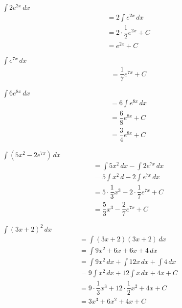 \documentclass[12pt]{article}
\newenvironment{problem}[2][]{
    \begin{trivlist}
        \item[
            {\bfseries #1}
            {\bfseries #2.}
        ]
}{\end{trivlist}}
\begin{document}
\begin{problem}{25}
$\displaystyle\int 2e^{2x} \, dx$
\begin{align}
&= 2 \int e^{2x} \, dx \\
&= 2 \cdot \dfrac{1}{2} e^{2x} + C \\
&= e^{2x} + C
\end{align}
\end{problem}

\begin{problem}{29}
$\displaystyle\int e^{7x} \, dx$
\begin{align}
&= \dfrac{1}{7} e^{7x} + C
\end{align}
\end{problem}

\begin{problem}{33}
$\displaystyle\int 6e^{8x} \, dx$
\begin{align}
&= 6 \int e^{8x} \, dx \\
&= \dfrac{6}{8} e^{8x} + C \\
&= \dfrac{3}{4} e^{8x} + C
\end{align}
\end{problem}

\begin{problem}{37}
$\displaystyle\int (5x^2 - 2e^{7x}) \, dx$
\begin{align}
&= \int 5x^2 \, dx - \int 2e^{7x} \, dx \\
&= 5 \int x^2 \, d - 2 \int e^{7x} \, dx \\
&= 5 \cdot \dfrac{1}{3} x^3 - 2 \cdot \dfrac{1}{7} e^{7x} + C \\
&= \dfrac{5}{3} x^3 - \dfrac{2}{7} e^{7x} + C
\end{align}
\end{problem}

\begin{problem}{41}
$\displaystyle\int (3x + 2)^2 \, dx$
\begin{align}
&= \int (3x + 2)(3x + 2) \, dx \\
&= \int 9x^2 + 6x + 6x + 4 \, dx \\
&= \int 9x^2 \, dx + \int 12x \, dx + \int 4 \, dx \\
&= 9 \int x^2 \, dx + 12 \int x \, dx + 4x + C \\
&= 9 \cdot \dfrac{1}{3} x^3 + 12 \cdot \dfrac{1}{2} x^2 + 4x + C \\
&= 3x^3 + 6x^2 + 4x + C
\end{align}
\end{problem}
\end{document}
